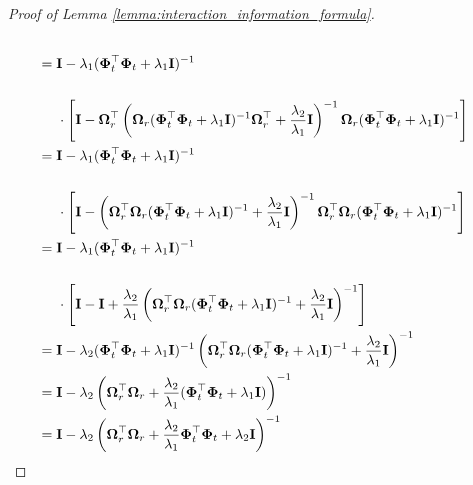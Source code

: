 \begin{proof}[Proof of Lemma \ref{lemma:interaction_information_formula}]
\begin{align*}
            \\
            &  = \mathbf{I} -  \lambda_1(\boldsymbol{\Phi}_t^\top\boldsymbol{\Phi}_t+\lambda_1 \mathbf{I})^{-1} \\ \notag
            \\ 
            & \;\;\;\;\;    \cdot \left[\mathbf{I} - \boldsymbol{\Omega}_r^\top \left(\boldsymbol{\Omega}_r(\boldsymbol{\Phi}_t^\top \boldsymbol{\Phi}_t+ \lambda_1\mathbf{I})^{-1}\boldsymbol{\Omega}_r^\top+\frac{\lambda_2} {\lambda_1} \mathbf{I}\right)^{-1} \boldsymbol{\Omega}_r (\boldsymbol{\Phi}_t^\top\boldsymbol{\Phi}_t+\lambda_1 \mathbf{I})^{-1} \right]
            \\
            & = \mathbf{I} -  \lambda_1(\boldsymbol{\Phi}_t^\top\boldsymbol{\Phi}_t+\lambda_1 \mathbf{I})^{-1} \\ \notag 
            \\
            & \;\;\;\;\; \cdot \left[\mathbf{I} -  \left(\boldsymbol{\Omega}_r^\top\boldsymbol{\Omega}_r(\boldsymbol{\Phi}_t^\top \boldsymbol{\Phi}_t+ \lambda_1\mathbf{I})^{-1}+\frac{\lambda_2} {\lambda_1} \mathbf{I}\right)^{-1} \boldsymbol{\Omega}_r^\top\boldsymbol{\Omega}_r (\boldsymbol{\Phi}_t^\top\boldsymbol{\Phi}_t+\lambda_1 \mathbf{I})^{-1}\right] \\ 
            & = \mathbf{I} -  \lambda_1(\boldsymbol{\Phi}_t^\top\boldsymbol{\Phi}_t+\lambda_1 \mathbf{I})^{-1} \\ \notag 
            \\
            & \;\;\;\;\; \cdot \left[\mathbf{I} -  \mathbf{I} + \frac{\lambda_2}{\lambda_1}\left(\boldsymbol{\Omega}_r^\top\boldsymbol{\Omega}_r(\boldsymbol{\Phi}_t^\top \boldsymbol{\Phi}_t+ \lambda_1\mathbf{I})^{-1}+\frac{\lambda_2} {\lambda_1} \mathbf{I}\right)^{-1} \right] \\ 
            & = \mathbf{I} - \lambda_2 (\boldsymbol{\Phi}_t^\top \boldsymbol{\Phi}_t+ \lambda_1\mathbf{I})^{-1}\left(\boldsymbol{\Omega}_r^\top\boldsymbol{\Omega}_r(\boldsymbol{\Phi}_t^\top \boldsymbol{\Phi}_t+ \lambda_1\mathbf{I})^{-1}+\frac{\lambda_2} {\lambda_1} \mathbf{I}\right)^{-1} \\
            & =\mathbf{I} - \lambda_2 \left(\boldsymbol{\Omega}_r^\top\boldsymbol{\Omega}_r+\frac{\lambda_2} {\lambda_1} (\boldsymbol{\Phi}_t^\top \boldsymbol{\Phi}_t+ \lambda_1\mathbf{I})\right)^{-1} \\
            & =\mathbf{I} - \lambda_2 \left(\boldsymbol{\Omega}_r^\top\boldsymbol{\Omega}_r+\frac{\lambda_2} {\lambda_1} \boldsymbol{\Phi}_t^\top \boldsymbol{\Phi}_t+ \lambda_2 \mathbf{I}\right)^{-1}  

\end{align*}
\end{proof}
